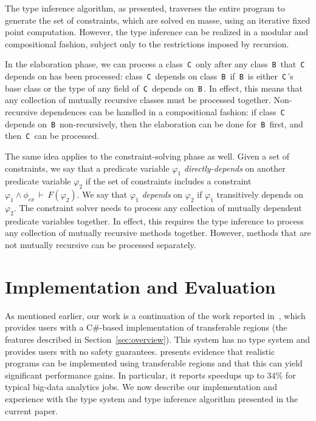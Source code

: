\documentclass[a4paper,UKenglish]{lipics-v2018}
\newcommand{\C}[1]{\code{#1}}
\newcommand{\code}[1]{\,{\tt #1}\,}
\newcommand{\conj}{\wedge}
\newcommand{\isvalid}[2]{#1\,\vdash\,#2}
\newcommand{\rgn}{r}
\newcommand{\phictxt}{\phi_{cx}}
\begin{document}
The type inference algorithm, as presented, traverses the entire
program to generate the set of constraints, which are solved en masse,
using an iterative fixed point computation. However, the type
inference can be realized in a modular and compositional fashion,
subject only to the restrictions imposed by recursion.

In the elaboration phase, we can process a class \C{C} only after any
class \C{B} that \C{C} depends on has been processed: class \C{C}
depends on class \C{B} if \C{B} is either \C{C}'s base class or the
type of any field of \C{C} depends on \C{B}. In effect, this means
that any collection of mutually recursive classes must be processed
together. Non-recursive dependences can be handled in a compositional
fashion: if class \C{C} depends on \C{B} non-recursively, then the
elaboration can be done for \C{B} first, and then \C{C} can be
processed.

The same idea applies to the constraint-solving phase as well.  Given
a set of constraints, we say that a predicate variable $\varphi_1$
\emph{directly-depends} on another predicate variable $\varphi_2$ if
the set of constraints includes a constraint $\isvalid{\varphi_1 \conj
\phictxt}{F(\varphi_2)}$.  We say that $\varphi_1$ \emph{depends} on
$\varphi_2$ if $\varphi_1$ transitively depends on $\varphi_2$.  The
constraint solver needs to process any collection of mutually
dependent predicate variables together.  In effect, this requires the
type inference to process any collection of mutually recursive methods
together.  However, methods that are not mutually recursive can be
processed separately.


\renewcommand{\rgn}{r}

\section{Implementation and Evaluation}
\label{sec:implementation}

As mentioned earlier, our work is a continuation of the work reported
in~\cite{Broom:HotOS}, which provides users with a C\#-based
implementation of transferable regions (the features described in
Section~\ref{sec:overview}). This system has no type system and
provides users with no safety guarantees. \cite{Broom:HotOS} presents
evidence that realistic programs can be implemented using transferable
regions and that this can yield significant performance gains.  In
particular, it reports speedups up to 34\% for typical big-data
analytics jobs.  We now describe our implementation and experience
with the type system and type inference algorithm presented in the
current paper.
\end{document}
